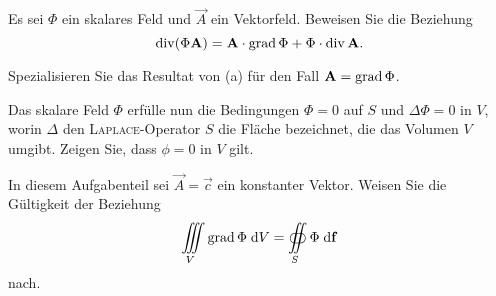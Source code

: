 \begin{atiTask}[
  title = Spezielle Vektorfelder
]

\begin{atiSubtasks}
\item Es sei $\Phi$ ein skalares Feld und $\vec{A}$ ein Vektorfeld. Beweisen Sie die Beziehung 
\[
\operatorname{div} (\Phi \mathbf{A})=\mathbf{A}\cdot\operatorname{grad} \Phi+\Phi\cdot \operatorname{div} \mathbf{A}.
\]
\item Spezialisieren Sie das Resultat von (a) für den Fall $\mathbf{A}=\operatorname{grad} \Phi$.
\item Das skalare Feld $\Phi$ erfülle nun die Bedingungen $\Phi=0$ auf $S$ und $\Delta \Phi=0$ in $V$, worin $\Delta$ den \textsc{Laplace}-Operator $S$ die Fläche bezeichnet, die das Volumen $V$ umgibt. Zeigen Sie, dass $\phi=0$ in $V$ gilt.
\item In diesem Aufgabenteil sei $\vec{A}=\vec{c}$ ein konstanter Vektor. Weisen Sie die Gültigkeit der Beziehung
\[
\iiint\limits_{V}\operatorname{grad} \Phi\;\mathrm{d}V=\oiint\limits_{S}\Phi\;\mathrm{d} \mathbf{f}
\]  
nach.
\end{atiSubtasks}


\end{atiTask}

\begin{atiSolution}
	
\end{atiSolution}